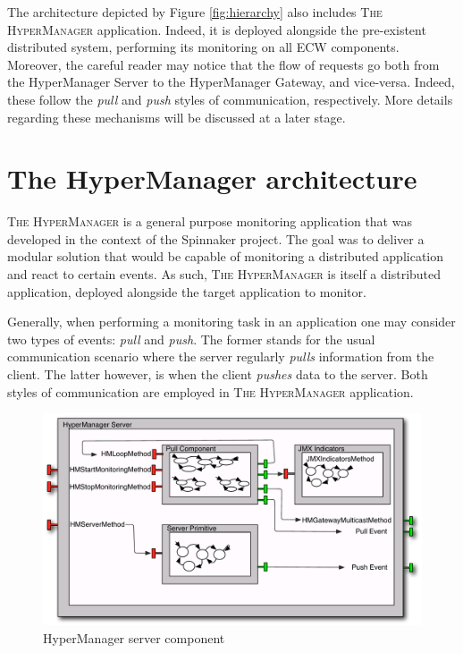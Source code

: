	  				
	The architecture depicted by Figure \ref{fig:hierarchy}
	also includes \textsc{The HyperManager} application. Indeed, it is deployed alongside	the pre-existent
	distributed system, performing its monitoring on all \textsf{ECW} components. Moreover, the careful reader may notice 
	that the flow of requests go both from the \textsf{HyperManager Server} to
	the \textsf{HyperManager Gateway}, and vice-versa. Indeed, these follow the \textit{pull} and \textit{push}
	styles of communication, respectively. More details regarding these mechanisms will be discussed at a later stage.
	
		
	\section[The HyperManager architecture]{The HyperManager architecture}
	\label{sub:thehm}
	
		 \textsc{The HyperManager} is a general purpose monitoring application that was developed 
	in the context of the Spinnaker project. The goal was to deliver a modular
	solution that would be capable of monitoring a distributed application and react to certain events.
	As such, \textsc{The HyperManager} is itself a distributed application, deployed alongside the target 
	application to monitor. %
		
	Generally, when performing a monitoring task in an application one may consider two types of
	events: \textit{pull} and \textit{push}. The former stands for the usual communication scenario
	where the server regularly \textit{pulls} information from the client. The latter however, 
	is when the client \textit{pushes} data to the server. Both styles
	of communication are employed in \textsc{The HyperManager} application. %
			
	\begin{figure}[H]
		\centering
		\includegraphics[scale=0.45]{figures/chapter3/HMServer-comp-v2.pdf}
		\caption{HyperManager server component}
		\label{fig:HMServer}		
	\end{figure}	
	
